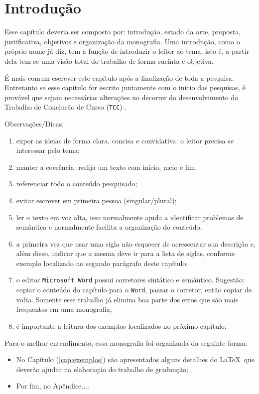 \chapter{Introdução} 
\label{cap:introducao}





Esse capítulo deveria ser composto por: introdução, estado da arte, proposta,  justificativa, objetivos e organização da monografia. Uma introdução, como o próprio nome já diz, tem a função de introduzir o leitor ao tema, isto é, a partir dela tem-se uma visão total do trabalho de forma sucinta e objetiva.

É mais comum escrever este capítulo após a finalização de toda a pesquisa. Entretanto se esse
capítulo for escrito juntamente com o início das pesquisas, é provável que sejam necessárias alterações no decorrer do desenvolvimento do Trabalho de Conclusão de Curso (\verb'TCC') \label{exemplo:nomenclatura}.

Observações/Dicas:
\begin{enumerate}
\item expor as ideias de forma clara, concisa e convidativa: o leitor precisa se interessar pelo tema;
\item manter a coerência: redija um texto com início, meio e fim;

\item referenciar todo o conteúdo pesquisado;

\item evitar escrever em primeira pessoa (singular/plural);

\item ler o texto em voz alta, isso normalmente ajuda a identificar  problemas de semântica e normalmente facilita a organização do conteúdo;

\item a primeira vez que usar uma sigla não esquecer de acrescentar sua descrição e, além disso, indicar que a mesma deve ir para a lista de siglas, conforme exemplo localizado no segundo parágrafo deste capítulo;

\item o editor \verb'Microsoft Word' possui corretores sintático e semântico. Sugestão: copiar o conteúdo do capítulo para o \verb'Word', passar o corretor, então copiar de volta. Somente esse trabalho já elimina boa parte dos erros que são mais frequentes em uma monografia;

\item é importante a leitura dos exemplos localizados no próximo capítulo.

\end{enumerate}


Para o melhor entendimento, essa monografia foi organizada da seguinte forma:

\begin{itemize}
\item No Capítulo (\ref{cap:exemplos}) são apresentados alguns detalhes do \LaTeX\ que deverão ajudar na elaboração do trabalho de graduação;

\item Por fim, no Apêndice....
\end{itemize}


